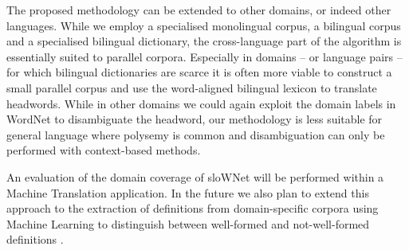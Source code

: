\documentclass[output=paper]{LSP/langsci}
\begin{document}
The proposed methodology can be extended to other domains, or indeed other languages. While we employ a specialised monolingual corpus, a bilingual corpus and a specialised bilingual dictionary, the cross-language part of the algorithm is essentially suited to parallel corpora. Especially in domains -- or language pairs -- for which bilingual dictionaries are scarce it is often more viable to construct a small parallel corpus and use the word-aligned bilingual lexicon to translate headwords. While in other domains we could again exploit the domain labels in WordNet to disambiguate the headword, our methodology is less suitable for general language where polysemy is common and disambiguation can only be performed with context-based methods.

An evaluation of the domain coverage of sloWNet will be performed within a Machine Translation application. In the future we also plan to extend this approach to the extraction of definitions from domain-specific corpora using Machine Learning to distinguish between well-formed and not-well-formed definitions \citep{Fišer2010}.

{\sloppy 
\printbibliography[heading=subbibliography,notkeyword=this]
}
\end{document}
